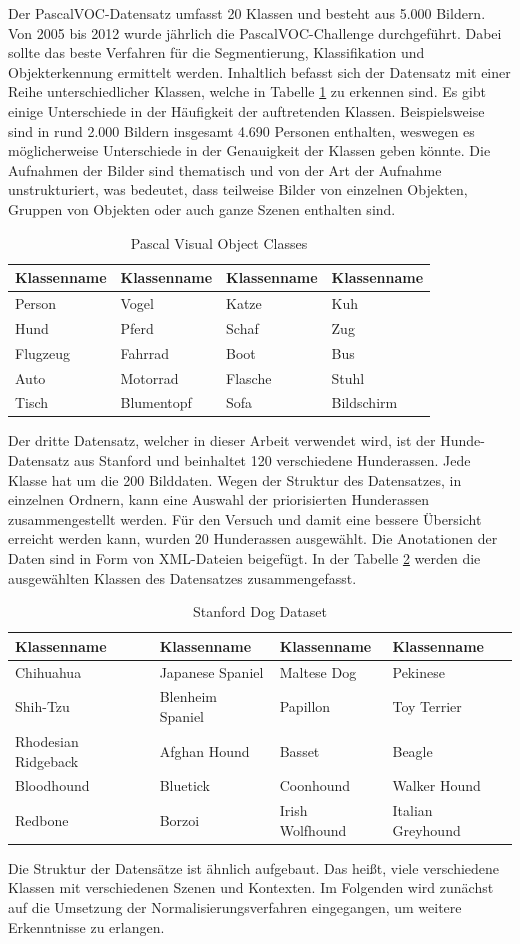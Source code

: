 Der PascalVOC-Datensatz umfasst 20 Klassen und besteht aus 5.000 Bildern. Von 2005 bis 2012 wurde jährlich die PascalVOC-Challenge durchgeführt. Dabei sollte das beste Verfahren für die Segmentierung, Klassifikation und Objekterkennung ermittelt werden. Inhaltlich befasst sich der Datensatz mit einer Reihe unterschiedlicher Klassen, welche in Tabelle \ref{tab:pvoc} zu erkennen sind. Es gibt einige Unterschiede in der Häufigkeit der auftretenden Klassen. Beispielsweise sind in rund 2.000 Bildern insgesamt 4.690 Personen enthalten, weswegen es möglicherweise Unterschiede in der Genauigkeit der Klassen geben könnte. Die Aufnahmen der Bilder sind thematisch und von der Art der Aufnahme unstrukturiert, was bedeutet, dass teilweise Bilder von einzelnen Objekten, Gruppen von Objekten oder auch ganze Szenen enthalten sind.
\begin{table}
[h]
\caption{Pascal Visual Object Classes \cite{pascal-voc-2007}}
\centering
\begin{tabular}{|l|l|l|l|}
\hline
Klassenname & Klassenname & Klassenname & Klassenname\\
\hline
Person & Vogel & Katze & Kuh\\
Hund & Pferd & Schaf & Zug\\
Flugzeug & Fahrrad & Boot & Bus\\
Auto & Motorrad & Flasche & Stuhl\\
Tisch & Blumentopf & Sofa & Bildschirm\\
\hline
\end{tabular}
\label{tab:pvoc}
\end{table}
Der dritte Datensatz, welcher in dieser Arbeit verwendet wird, ist der Hunde-Datensatz aus Stanford und beinhaltet 120 verschiedene Hunderassen. Jede Klasse hat um die 200 Bilddaten. Wegen der Struktur des Datensatzes, in einzelnen Ordnern, kann eine Auswahl der priorisierten Hunderassen zusammengestellt werden. Für den Versuch und damit eine bessere Übersicht erreicht werden kann, wurden 20 Hunderassen ausgewählt. Die Anotationen der Daten sind in Form von XML-Dateien beigefügt. In der Tabelle \ref{tab:sdd} werden die ausgewählten Klassen des Datensatzes zusammengefasst.
\begin{table}
[h]
\caption{Stanford Dog Dataset \cite{KhoslaYaoJayadevaprakashFeiFei_FGVC2011}}
\label{tab:sdd}
\centering
\begin{tabular}{|l|l|l|l|}
\hline
Klassenname & Klassenname & Klassenname & Klassenname\\
\hline
Chihuahua & Japanese Spaniel & Maltese Dog & Pekinese\\
Shih-Tzu & Blenheim Spaniel & Papillon & Toy Terrier\\
Rhodesian Ridgeback & Afghan Hound & Basset & Beagle\\
Bloodhound & Bluetick & Coonhound & Walker Hound\\
Redbone & Borzoi & Irish Wolfhound & Italian Greyhound\\
\hline
\end{tabular}
\end{table}
Die Struktur der Datensätze ist ähnlich aufgebaut. Das heißt, viele verschiedene Klassen mit verschiedenen Szenen und Kontexten. Im Folgenden wird zunächst auf die Umsetzung der Normalisierungsverfahren eingegangen, um weitere Erkenntnisse zu erlangen.
